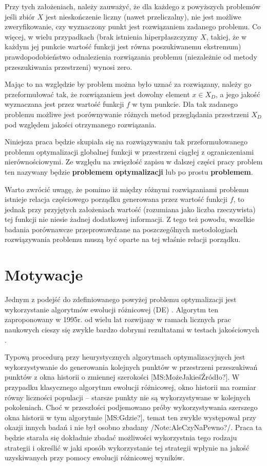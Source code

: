 \documentclass[11pt,a4paper]{report}
\begin{document}
{\par{
Przy tych założeniach, należy zauważyć, że dla każdego z powyższych problemów jeśli zbiór $X$ jest nieskończenie liczny (nawet przeliczalny), nie jest możliwe zweryfikowanie, czy wyznaczony punkt jest rozwiązaniem zadanego problemu. Co więcej, w wielu przypadkach (brak istnienia hiperpłaszczyzny $X$, takiej, że w każdym jej punkcie wartość funkcji jest równa poszukiwanemu ekstremum) prawdopodobieństwo odnalezienia rozwiązania problemu (niezależnie od metody przeszukiwania przestrzeni) wynosi zero.
}
\par{
Mając to na względzie by problem można było uznać za rozwiązany, należy go przeformułować tak, że rozwiązaniem jest dowolny element $x \in X_D$, a jego jakość wyznaczana jest przez wartość funkcji $f$ w tym punkcie. Dla tak zadanego problemu możliwe jest porównywanie różnych metod przeglądania przestrzeni $X_D$ pod względem jakości otrzymanego rozwiązania.
}
\par{
Niniejsza praca będzie skupiała się na rozwiązywaniu tak przeformułowanego problemu optymalizacji globalnej funkcji w przestrzeni ciągłej z ograniczeniami nierównościowymi. Ze względu na zwięzłość zapisu w dalszej części pracy problem ten nazywany będzie \textbf{problemem optymalizacji} lub po prostu \textbf{problemem}. 
}
\par{
Warto zwrócić uwagę, że pomimo iż między różnymi rozwiązaniami problemu istnieje relacja częściowego porządku generowana przez wartość funkcji $f$, to jednak przy przyjętych założeniach wartość (rozumiana jako liczba rzeczywista) tej funkcji nie niesie żadnej dodatkowej informacji. Z tego też powodu, wszelkie badania porównawcze przeprowawdzane na poszczególnych metodologiach rozwiązywania problemu muszą być oparte na tej właśnie relacji porządku.
}

\section{Motywacje}
\par{
Jednym z podejść do zdefiniowanego powyżej problemu optymalizacji jest wykorzystanie algorytmów ewolucji różnicowej (DE) \cite{RainerStorn}. Algorytm ten zaproponowany w 1995r. od wielu lat rozwijany w ramach licznych prac naukowych \cite{Opara} cieszy się zwykle bardzo dobrymi rezultatami w testach jakościowych \cite{CEC2013Comp}. 
}
\par{
Typową procedurą przy heurystycznych algorytmach optymalizacyjnych jest wykorzystywanie do generowania kolejnych punktów w przestrzeni przeszukiwań punktów z okna historii o zmiennej szerokości [MS:MożeJakieśŹródło?]. W przypadku klasycznego algorytmu ewolucji różnicowej, okno historii ma rozmiar równy liczności populacji -- starsze punkty nie są wykorzystywane w kolejnych pokoleniach. Choć w przeszłości podjemowano próby wykorzystywania szerszego okna historii w tym algorytmie [MS:Gdzie?], temat ten zwykle występował przy okazji innych badań i nie był osobno zbadany /Note:AleCzyNaPewno?/. Praca ta będzie starała się dokładnie zbadać możliwości wykorzystnia tego rodzaju strategii i określić w jaki sposób wykorzystanie tej strategii wpłynie na jakość uzyskiwanych przy pomocy ewolucji różnicowej wyników.
}

}
\end{document}
